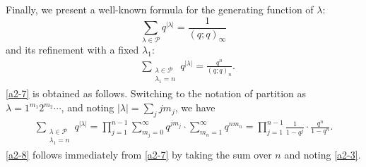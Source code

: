 \documentclass[11pt]{article}
\numberwithin{equation}{section}
\numberwithin{equation}{section}
\def\i{\infty}
\def\l{\lambda}
\def\Pe{\mathcal{P}}
\begin{document}
Finally, we present a well-known formula for the generating function of $\lambda$:
\begin{equation}
 \label{a2-8}
 \sum_{\l\in\Pe}
 q^{|\l|}=\frac{1}{(q;q)_\i}
\end{equation}
and its refinement with a fixed $\lambda_1$:
\begin{align}
\label{a2-7}
 &\sum_{\substack{\l\in\Pe\\ \l_1=n}}
 q^{|\l|}=\frac{q^n}{(q;q)_n}.
\end{align}
 \eqref{a2-7} is obtained as follows. Switching to the notation of partition as $\l=1^{m_1}2^{m_2}\cdots$,
 and noting $|\l|=\sum_{j}jm_j$, we have
\begin{align*}
 \sum_{\substack{\l\in\Pe\\ \l_1=n}}
 q^{|\l|}
 =
 \prod_{j=1}^{n-1}\sum_{m_j=0}^{\i}
 q^{jm_j}\cdot \sum_{m_n=1}^{\i}q^{n m_n}=\prod_{j=1}^{n-1}\frac{1}{1-q^j}
 \cdot\frac{q^n}{1-q^n}.
\end{align*}
\eqref{a2-8} follows immediately from \eqref{a2-7} by taking the sum over $n$ and noting \eqref{a2-3}.
\end{document}
